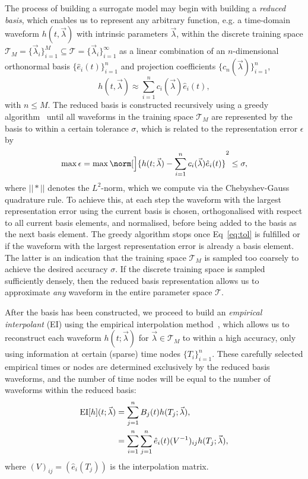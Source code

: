 \documentclass[prd,amssymb,amsmath,amsfonts,superscriptaddress,nofootinbib,reprint,showpacs, longbibliography]{revtex4-1}
\begin{document}
The process of building a surrogate model may begin with building a \emph{reduced basis}, which enables us to represent any arbitrary function, e.g. a time-domain waveform $h(t,\vec{\lambda})$ with intrinsic parameters $\vec{\lambda}$, within the discrete training space $\mathcal{T}_M = \{ \vec{\lambda}_i\}_{i=1}^{M} \subseteq \mathcal{T} = \{ \vec{\lambda}_i\}_{i=1}^{\infty}$ as a linear combination of an $n$-dimensional orthonormal basis $\{ \hat{e}_i(t)\}_{i=1}^{n}$ and projection coefficients $\{c_n (\vec{\lambda})\}_{i=1}^{n}$,
\begin{equation}
    h(t, \vec{\lambda}) \approx \sum_{i=1}^{n} c_{i}(\vec{\lambda})\hat{e}_{i}(t),
\end{equation}
with $n \leq M$. 
The reduced basis is constructed recursively using a greedy algorithm~\cite{Field:2011mf, Field:2013cfa} until all waveforms in the training space $\mathcal{T}_M$ are represented by the basis to within a certain tolerance $\sigma$, which is related to the representation error $\epsilon$ by
\begin{equation}
    \max{\epsilon} = \max \norm[\Big]{ h(t; \vec{\lambda}) - \sum_{i=1}^n c_{i}(\vec{\lambda})\hat{e}_{i}(t) }^2 \leq \sigma,
    \label{eq:tol}
\end{equation}
where $||*||$ denotes the $L^2$-norm, which we compute via the Chebyshev-Gauss quadrature rule.
To achieve this, at each step the waveform with the largest representation error using the current basis is chosen, orthogonalised with respect to all current basis elements, and normalised, before being added to the basis as the next basis element. The greedy algorithm stops once Eq~\eqref{eq:tol} is fulfilled or if the waveform with the largest representation error is already a basis element. The latter is an indication that the training space $\mathcal{T}_M$ is sampled too coarsely to achieve the desired accuracy $\sigma$. 
If the discrete training space is sampled sufficiently densely, then the reduced basis representation allows us to approximate \emph{any} waveform in the entire parameter space $\mathcal{T}$.

After the basis has been constructed, we proceed to build an \emph{empirical interpolant} (EI) using the empirical interpolation method~\cite{BARRAULT2004667, Maday:2009}, which allows us to reconstruct each waveform $h(t;\vec{\lambda})$ for $\vec{\lambda} \in \mathcal{T}_M$ to within a high accuracy, only using information at certain (sparse) time nodes $\{T_i\}^{n}_{i=1}$. These carefully selected empirical times or nodes are determined exclusively by the reduced basis waveforms, and the number of time nodes will be equal to the number of waveforms within the reduced basis:
\begin{align}
    {\rm EI}[h](t; \vec{\lambda}) &= \sum_{j=1}^n B_j(t) h(T_j; \vec{\lambda}),\\
    &= \sum_{i=1}^n \sum_{j=1}^n \hat{e}_i(t)(V^{-1})_{ij} h(T_j; \vec{\lambda}),
\end{align}
where $(V)_{ij} = (\hat{e}_i(T_j))$ is the interpolation matrix.
\end{document}
